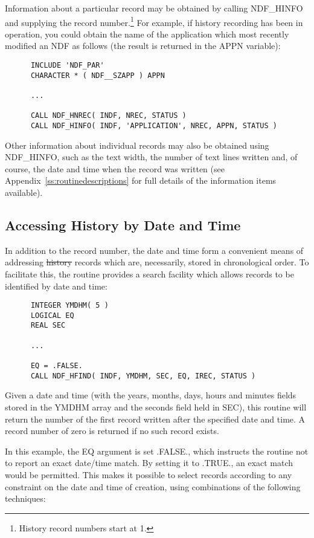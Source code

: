 Information about a particular record may be obtained by calling
NDF\_HINFO and supplying the record number.\footnote{History record
numbers start at 1.} For example, if history recording has been in
operation, you could obtain the name of the application which most
recently modified an NDF as follows (the result is returned in the
APPN variable):

\small
\begin{verbatim}
      INCLUDE 'NDF_PAR'
      CHARACTER * ( NDF__SZAPP ) APPN

      ...

      CALL NDF_HNREC( INDF, NREC, STATUS )
      CALL NDF_HINFO( INDF, 'APPLICATION', NREC, APPN, STATUS )
\end{verbatim}
\normalsize

Other information about individual records may also be obtained using
NDF\_HINFO, such as the text width, the number of text lines written
and, of course, the date and time when the record was written (see
Appendix~\ref{ss:routinedescriptions} for full details of the
information items available).

\subsection{Accessing History by Date and Time}

In addition to the record number, the date and time form a convenient
means of addressing \st{history\/} records which are, necessarily, stored in
chronological order. To facilitate this, the  routine
provides a search facility which allows records to be identified by
date and time:

\small
\begin{verbatim}
      INTEGER YMDHM( 5 )
      LOGICAL EQ
      REAL SEC

      ...

      EQ = .FALSE.
      CALL NDF_HFIND( INDF, YMDHM, SEC, EQ, IREC, STATUS )
\end{verbatim}
\normalsize

Given a date and time (with the years, months, days, hours and minutes
fields stored in the YMDHM array and the seconds field held in SEC),
this routine will return the number of the first record written after
the specified date and time. A record number of zero is returned if no
such record exists.

In this example, the EQ argument is set .FALSE., which instructs the
routine not to report an exact date/time match. By setting it to
.TRUE., an exact match would be permitted. This makes it possible to
select records according to any constraint on the date and time of
creation, using combinations of the following techniques:

